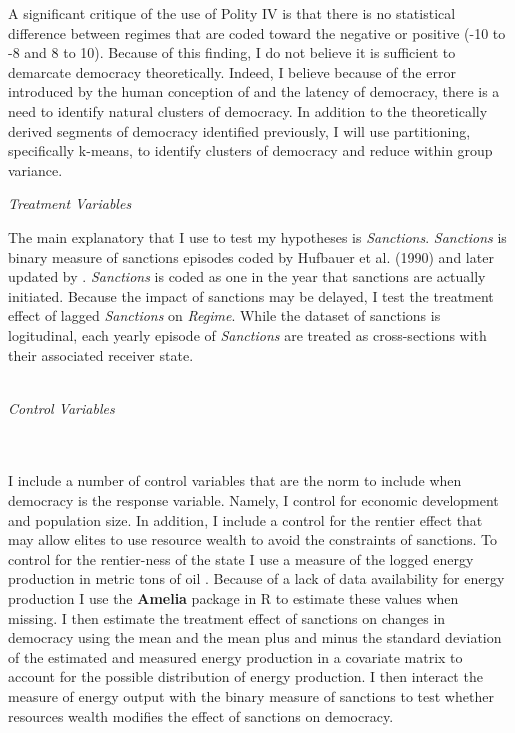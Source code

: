 \documentclass[a4paper]{article}\usepackage[]{graphicx}\usepackage[]{color}
\begin{document}
\par
A significant critique of the use of Polity IV is that there is no statistical difference between regimes that are coded toward the negative or positive (-10 to -8 and 8 to 10)\citep{treier2008democracy}. Because of this finding, I do not believe it is sufficient to demarcate democracy theoretically.  Indeed, I believe because of the error introduced by the human conception of and the latency of democracy, there is a need to identify natural clusters of democracy. In addition to the theoretically derived segments of democracy identified previously, I will use partitioning, specifically k-means, to identify clusters of democracy and reduce within group variance.
\par
\centerline{\textit{Treatment Variables}}
\par
The main explanatory that I use to test my hypotheses is \textit{Sanctions}. \textit{Sanctions} is binary measure of sanctions episodes coded by Hufbauer et al. (1990) and later updated by \citet{marinov2005economic}. \textit{Sanctions} is coded as one in the year that sanctions are actually initiated. Because the impact of sanctions may be delayed, I test the treatment effect of lagged \textit{Sanctions} on \textit{Regime}. While the dataset of sanctions is logitudinal, each yearly episode of \textit{Sanctions} are treated as cross-sections with their associated receiver state. \\
\\
\centerline{\textit{Control Variables}}
\\
\\
I include a number of control variables that are the norm to include when democracy is the response variable. Namely, I control for economic development and population size. In addition, I include a control for the rentier effect that may allow elites to use resource wealth to avoid the constraints of sanctions. To control for the rentier-ness of the state I use a measure of the logged energy production in metric tons of oil \citep{norris2008driving}. Because of a lack of data availability for energy production I use the \textbf{Amelia} package in R to estimate these values when missing\citep{honaker2011amelia}. I then estimate the treatment effect of sanctions on changes in democracy using the mean and the mean plus and minus the standard deviation of the estimated and measured energy production in a covariate matrix to account for the possible distribution of energy production. I then interact the measure of energy output with the binary measure of sanctions to test whether resources wealth modifies the effect of sanctions on democracy. 
\end{document}
